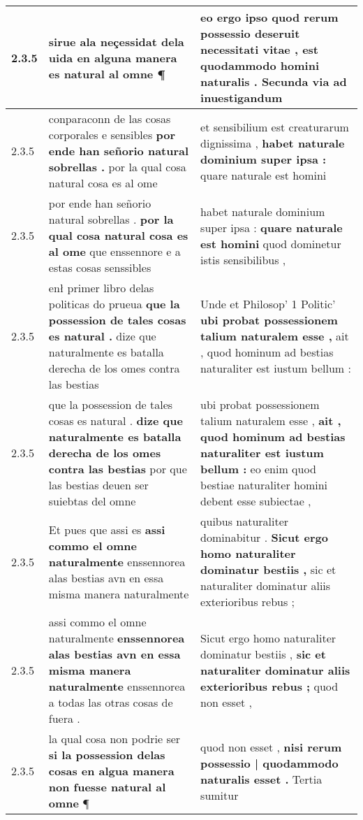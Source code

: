 \begin{tabular}{|p{1cm}|p{6.5cm}|p{6.5cm}|}
2.3.5 & sirue ala neçessidat dela uida \textbf{ en alguna manera es natural al omne } ¶ & eo ergo ipso quod rerum possessio deseruit necessitati vitae , \textbf{ est quodammodo homini naturalis . } Secunda via ad inuestigandum \\\hline
2.3.5 & conparaconn de las cosas corporales e sensibles \textbf{ por ende han señorio natural sobrellas . } por la qual cosa natural cosa es al ome & et sensibilium est creaturarum dignissima , \textbf{ habet naturale dominium super ipsa : } quare naturale est homini \\\hline
2.3.5 & por ende han señorio natural sobrellas . \textbf{ por la qual cosa natural cosa es al ome } que enssennore e a estas cosas senssibles & habet naturale dominium super ipsa : \textbf{ quare naturale est homini } quod dominetur istis sensibilibus , \\\hline
2.3.5 & enł primer libro delas politicas do prueua \textbf{ que la possession de tales cosas es natural . } dize que naturalmente es batalla derecha de los omes contra las bestias & Unde et Philosop’ 1 Politic’ \textbf{ ubi probat possessionem talium naturalem esse , } ait , quod hominum ad bestias naturaliter est iustum bellum : \\\hline
2.3.5 & que la possession de tales cosas es natural . \textbf{ dize que naturalmente es batalla derecha de los omes contra las bestias } por que las bestias deuen ser suiebtas del omne & ubi probat possessionem talium naturalem esse , \textbf{ ait , quod hominum ad bestias naturaliter est iustum bellum : } eo enim quod bestiae naturaliter homini debent esse subiectae , \\\hline
2.3.5 & Et pues que assi es \textbf{ assi commo el omne naturalmente } enssennorea alas bestias avn en essa misma manera naturalmente & quibus naturaliter dominabitur . \textbf{ Sicut ergo homo naturaliter dominatur bestiis , } sic et naturaliter dominatur aliis exterioribus rebus ; \\\hline
2.3.5 & assi commo el omne naturalmente \textbf{ enssennorea alas bestias avn en essa misma manera naturalmente } enssennorea a todas las otras cosas de fuera . & Sicut ergo homo naturaliter dominatur bestiis , \textbf{ sic et naturaliter dominatur aliis exterioribus rebus ; } quod non esset , \\\hline
2.3.5 & la qual cosa non podrie ser \textbf{ si la possession delas cosas en algua manera non fuesse natural al omne } ¶ & quod non esset , \textbf{ nisi rerum possessio | quodammodo naturalis esset . } Tertia sumitur \\\hline

\end{tabular}

